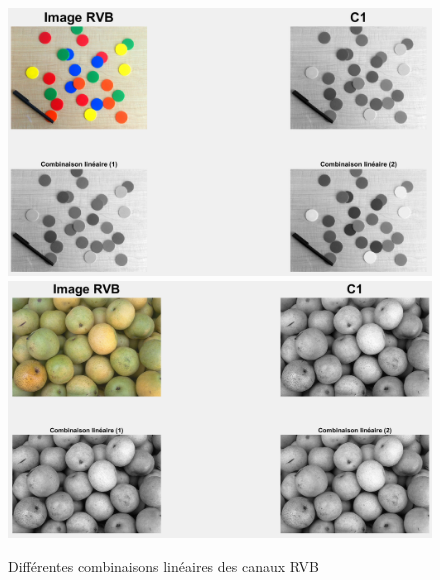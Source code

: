 \documentclass[a4paper,12pt]{article}
\theoremstyle{break}
\begin{document}
\begin{figure}[htbp]
	\centering
	\includegraphics[scale=0.55]{img/TP1_ex3_figure_coloredChips.PNG}
	\includegraphics[scale=0.55]{img/TP1_ex3_figure_pears.PNG}
	\caption{Différentes combinaisons linéaires des canaux RVB}
\end{figure}
\end{document}
